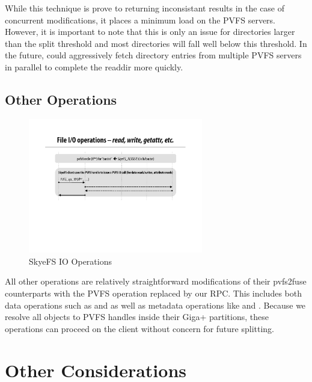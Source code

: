 \documentclass[onecolumn, 11pt, letterpaper]{article}
\begin{document}
While this technique is prove to returning inconsistant results in the case of
concurrent modifications, it places a minimum load on the PVFS servers.
However, it is important to note that this is only an issue for directories
larger than the split threshold and most directories will fall well below this
threshold.  In the future,  could aggressively fetch
directory entries from multiple PVFS servers in parallel to complete the
readdir more quickly.

\subsection{Other Operations}
\begin{figure}
\begin{center}
\includegraphics[width=3in]{figure-other}
\end{center}
\caption{SkyeFS IO Operations}
\end{figure}
All other operations are relatively straightforward modifications of their
pvfs2\-fuse counterparts with the PVFS  operation replaced by our
RPC.  This includes both data operations such as  and 
as well as metadata operations like  and .  Because we
resolve all objects to PVFS handles inside their Giga+ partitions, these
operations can proceed on the client without concern for future splitting.

\section{Other Considerations}
\end{document}
